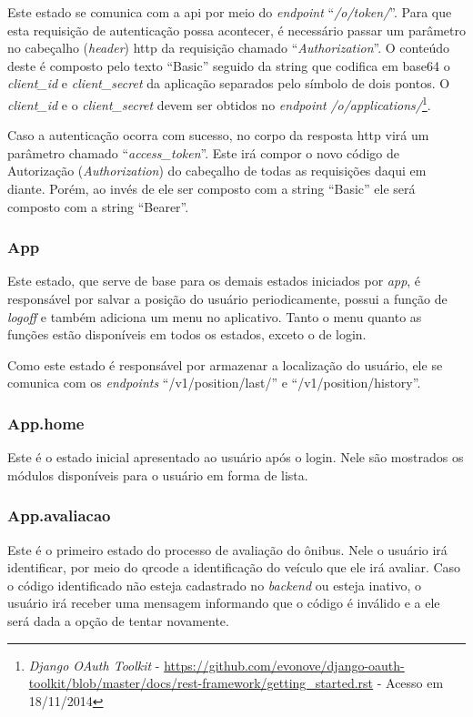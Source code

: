 Este estado se comunica com a \gls{api} por meio do \textit{endpoint} ``\textit{/o/token/}''. Para que esta requisição de autenticação possa acontecer, é necessário passar um parâmetro no cabeçalho (\textit{header}) \gls{http} da requisição chamado ``\textit{Authorization}''. O conteúdo deste é composto pelo texto ``Basic\textvisiblespace'' seguido da string que codifica em base64 o \textit{client\_id} e \textit{client\_secret} da aplicação separados pelo símbolo de dois pontos. O \textit{client\_id} e o \textit{client\_secret} devem ser obtidos no \textit{endpoint} \textit{/o/applications/}\footnote{\textit{Django OAuth Toolkit} - \url{https://github.com/evonove/django-oauth-toolkit/blob/master/docs/rest-framework/getting\_started.rst} - Acesso em 18/11/2014}.

Caso a autenticação ocorra com sucesso, no corpo da resposta \gls{http} virá um parâmetro chamado ``\textit{access\_token}''. Este irá compor o novo código de Autorização (\textit{Authorization}) do cabeçalho de todas as requisições daqui em diante. Porém, ao invés de ele ser composto com a string ``Basic'' ele será composto com a string ``Bearer\textvisiblespace''.

\subsubsection{App}
Este estado, que serve de base para os demais estados iniciados por \textit{app}, é responsável por salvar a posição do usuário periodicamente, possui a função de \textit{logoff} e também adiciona um menu no aplicativo. Tanto o menu quanto as funções estão disponíveis em todos os estados, exceto o de login.

Como este estado é responsável por armazenar a localização do usuário, ele se comunica com os \textit{endpoints} ``/v1/position/last/'' e ``/v1/position/history''.

\subsubsection{App.home}
Este é o estado inicial apresentado ao usuário após o login. Nele são mostrados os módulos disponíveis para o usuário em forma de lista.

\subsubsection{App.avaliacao}
Este é o primeiro estado do processo de avaliação do ônibus. Nele o usuário irá identificar, por meio do \gls{qrcode} a identificação do veículo que ele irá avaliar. Caso o código identificado não esteja cadastrado no \textit{backend} ou esteja inativo, o usuário irá receber uma mensagem informando que o código é inválido e a ele será dada a opção de tentar novamente.

